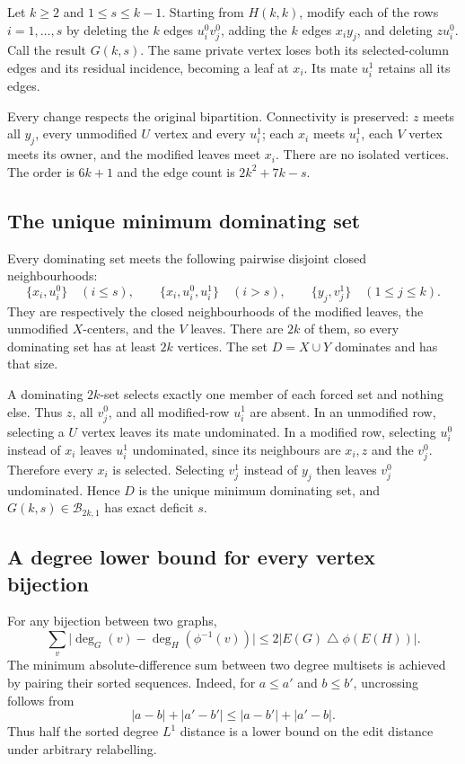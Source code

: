 \documentclass[11pt]{article}
\theoremstyle{definition}
\theoremstyle{remark}
\begin{document}
Let $k\ge2$ and $1\le s\le k-1$. Starting from $H(k,k)$, modify each
of the rows $i=1,\ldots,s$ by deleting the $k$ edges $u_i^0v_j^0$,
adding the $k$ edges $x_i y_j$, and deleting $zu_i^0$. Call the result
$G(k,s)$. The same private vertex loses both its selected-column edges
and its residual incidence, becoming a leaf at $x_i$. Its mate $u_i^1$
retains all its edges.

Every change respects the original bipartition. Connectivity is
preserved: $z$ meets all $y_j$, every unmodified $U$ vertex and every
$u_i^1$; each $x_i$ meets $u_i^1$, each $V$ vertex meets its owner, and
the modified leaves meet $x_i$. There are no isolated vertices.
The order is $6k+1$ and the edge count is $2k^2+7k-s$.

\subsection{The unique minimum dominating set}

Every dominating set meets the following pairwise disjoint closed
neighbourhoods:
\[
 \{x_i,u_i^0\}\quad(i\le s),\qquad
 \{x_i,u_i^0,u_i^1\}\quad(i>s),\qquad
 \{y_j,v_j^1\}\quad(1\le j\le k).
\]
They are respectively the closed neighbourhoods of the modified leaves,
the unmodified $X$-centers, and the $V$ leaves. There are $2k$ of them,
so every dominating set has at least $2k$ vertices. The set $D=X\cup Y$
dominates and has that size.

A dominating $2k$-set selects exactly one member of each forced set
and nothing else. Thus $z$, all $v_j^0$, and all modified-row $u_i^1$
are absent. In an unmodified row, selecting a $U$ vertex leaves its mate
undominated. In a modified row, selecting $u_i^0$ instead of $x_i$
leaves $u_i^1$ undominated, since its neighbours are $x_i,z$ and the
$v_j^0$. Therefore every $x_i$ is selected. Selecting $v_j^1$ instead
of $y_j$ then leaves $v_j^0$ undominated. Hence $D$ is the unique minimum
dominating set, and $G(k,s)\in\mathcal B_{2k,1}$ has exact deficit $s$.

\subsection{A degree lower bound for every vertex bijection}

For any bijection between two graphs,
\[
 \sum_v\bigl|\deg_G(v)-\deg_H(\phi^{-1}(v))\bigr|
 \le2|E(G)\mathbin{\triangle}\phi(E(H))|.
\]
The minimum absolute-difference sum between two degree multisets is
achieved by pairing their sorted sequences. Indeed, for $a\le a'$ and
$b\le b'$, uncrossing follows from
\[
 |a-b|+|a'-b'|\le|a-b'|+|a'-b|.
\]
Thus half the sorted degree $L^1$ distance is a lower bound on the
edit distance under arbitrary relabelling.
\end{document}
